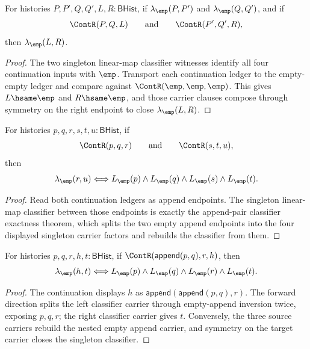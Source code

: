 \begin{theorem}
\label{thm:linearmap-singleton-classifier-continuation-closed}
For histories $P,P',Q,Q',L,R:\mathsf{BHist}$, if
$\lambda_{\emp}(P,P')$ and $\lambda_{\emp}(Q,Q')$, and if
$$
\ContR(P,Q,L)
\qquad\text{and}\qquad
\ContR(P',Q',R),
$$
then $\lambda_{\emp}(L,R)$.
\end{theorem}
\begin{proof}
The two singleton linear-map classifier witnesses identify all four
continuation inputs with $\emp$. Transport each continuation ledger to the
empty-empty ledger and compare against $\ContR(\emp,\emp,\emp)$. This gives
$L\hsame\emp$ and $R\hsame\emp$, and those carrier clauses compose through
symmetry on the right endpoint to close $\lambda_{\emp}(L,R)$.
\end{proof}

\begin{theorem}
\label{thm:linearmap-singleton-classifier-continuation-pair-factors}
For histories $p,q,r,s,t,u:\mathsf{BHist}$, if
$$
\ContR(p,q,r)
\qquad\text{and}\qquad
\ContR(s,t,u),
$$
then
$$
\lambda_{\emp}(r,u)
\Longleftrightarrow
L_{\emp}(p)\wedge L_{\emp}(q)\wedge L_{\emp}(s)\wedge L_{\emp}(t).
$$
\end{theorem}
\begin{proof}
Read both continuation ledgers as append endpoints. The singleton linear-map
classifier between those endpoints is exactly the append-pair classifier
exactness theorem, which splits the two empty append endpoints into the four
displayed singleton carrier factors and rebuilds the classifier from them.
\end{proof}

\begin{theorem}
\label{thm:linearmap-singleton-classifier-continuation-append-source-classifier}
For histories $p,q,r,h,t:\mathsf{BHist}$, if
$\ContR(\mathsf{append}(p,q),r,h)$, then
$$
\lambda_{\emp}(h,t)
\Longleftrightarrow
L_{\emp}(p)\wedge L_{\emp}(q)\wedge L_{\emp}(r)\wedge L_{\emp}(t).
$$
\end{theorem}
\begin{proof}
The continuation displays $h$ as $\mathsf{append}(\mathsf{append}(p,q),r)$.
The forward direction splits the left classifier carrier through empty-append
inversion twice, exposing $p,q,r$; the right classifier carrier gives $t$.
Conversely, the three source carriers rebuild the nested empty append carrier,
and symmetry on the target carrier closes the singleton classifier.
\end{proof}

